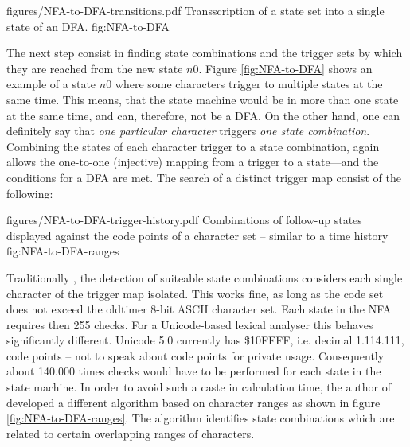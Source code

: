 \showpic
{figures/NFA-to-DFA-transitions.pdf}
{Transscription of a state set into a single state of an DFA.}
{fig:NFA-to-DFA}

The next step consist in finding state combinations and the trigger sets by which
they are reached from the new state $n0$. Figure \ref{fig:NFA-to-DFA} shows an example
of a state $n0$ where some characters trigger to multiple states at the same
time. This means, that the state machine would be in more than one state at the
same time, and can, therefore, not be a DFA. On the other hand, one can definitely
say that {\it one particular character} triggers {\it one state combination}. 
Combining the states of each character trigger to a state combination, again allows
the one-to-one (injective) mapping from a trigger to a state---and the conditions
for a DFA are met. The search of a distinct trigger map consist of the following:


\showpic
{figures/NFA-to-DFA-trigger-history.pdf}
{Combinations of follow-up states displayed against the code points of a character
    set -- similar to a time history}
{fig:NFA-to-DFA-ranges}    

Traditionally \cite{}, \cite{} the detection of suiteable state combinations 
considers each single character of the trigger map isolated.  This works fine, as long as the
code set does not exceed the oldtimer 8-bit ASCII character set. Each state in
the NFA requires then 255 checks.  For a Unicode-based lexical analyser this behaves
significantly different. Unicode 5.0 currently has \$10FFFF, i.e. decimal 1.114.111,
	      code points -- not to speak about code points for private usage.
	      Consequently about 140.000 times checks would have to be performed for each state in the state machine.
	      In order to avoid such a caste in calculation time, the author of {\quex} developed a
	      different algorithm based on character ranges as shown in figure \ref{fig:NFA-to-DFA-ranges}. 
The algorithm identifies state combinations which are related to certain overlapping ranges
of characters. 

